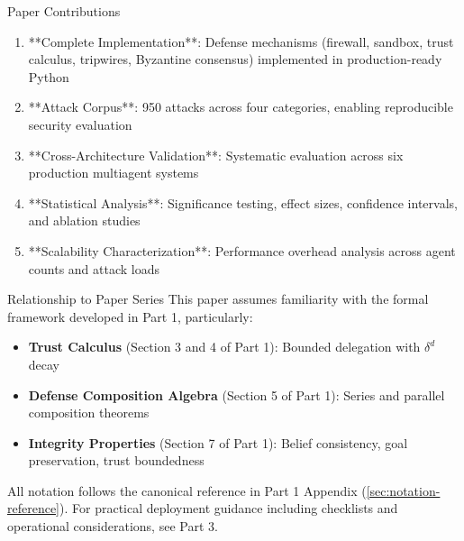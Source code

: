 \documentclass[
  ignorenonframetext,
]{beamer}
\providecommand{\tightlist}{%
  \setlength{\itemsep}{0pt}\setlength{\parskip}{0pt}}
\begin{document}
\begin{frame}{Paper Contributions}
\begin{enumerate}
\item **Complete Implementation**: Defense mechanisms (firewall, sandbox, trust calculus, tripwires, Byzantine consensus) implemented in production-ready Python
\item **Attack Corpus**: 950 attacks across four categories, enabling reproducible security evaluation
\item **Cross-Architecture Validation**: Systematic evaluation across six production multiagent systems
\item **Statistical Analysis**: Significance testing, effect sizes, confidence intervals, and ablation studies
\item **Scalability Characterization**: Performance overhead analysis across agent counts and attack loads
\end{enumerate}
\end{frame}

\begin{frame}{Relationship to Paper Series}
\protect{}\label{relationship-to-paper-series}
This paper assumes familiarity with the formal framework developed in
Part 1, particularly:

\begin{itemize}
\tightlist
\item
  \textbf{Trust Calculus} (Section 3 and 4 of Part 1): Bounded
  delegation with \(\delta^d\) decay
\item
  \textbf{Defense Composition Algebra} (Section 5 of Part 1): Series and
  parallel composition theorems
\item
  \textbf{Integrity Properties} (Section 7 of Part 1): Belief
  consistency, goal preservation, trust boundedness
\end{itemize}

All notation follows the canonical reference in Part 1 Appendix
(\cref{sec:notation-reference}). For practical deployment guidance
including checklists and operational considerations, see Part 3.
\end{frame}
\end{document}
